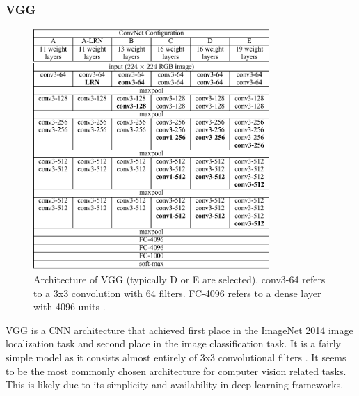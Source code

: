 \subsubsection{VGG}
\begin{figure}
    \centering
    \includegraphics[width=0.8\textwidth]{images/vgg_arch.png}
    \caption{Architecture of VGG (typically D or E are selected). conv3-64 refers to a 3x3 convolution with 64 filters. FC-4096 refers to a dense layer with 4096 units \cite{vgg}.}
    \label{vgg}
\end{figure}
VGG is a CNN architecture that achieved first place in the ImageNet 2014 image localization task and second place in the image classification task. It is a fairly simple model as it consists almost entirely of 3x3 convolutional filters \cite{vgg}. It seems to be the most commonly chosen architecture for computer vision related tasks. This is likely due to its simplicity and availability in deep learning frameworks.

